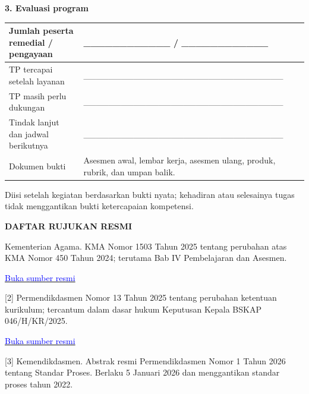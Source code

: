 \documentclass[11pt,a4paper]{article}
\begin{document}
\par\medskip\noindent\textbf{3. Evaluasi program}\par\smallskip
{\small\setlength{\tabcolsep}{2mm}\renewcommand{\arraystretch}{1.35}\begin{longtable}{|>{\raggedright\arraybackslash}p{77.826mm}|>{\raggedright\arraybackslash}p{91.724mm}|}\hline
Jumlah peserta remedial / pengayaan & \_\_\_\_\_\_\_\_\_\_\_\_ / \_\_\_\_\_\_\_\_\_\_\_\_\\ \hline
TP tercapai setelah layanan & \_\_\_\_\_\_\_\_\_\_\_\_\_\_\_\_\_\_\_\_\_\_\_\_\_\_\_\_\_\_\_\_\\ \hline
TP masih perlu dukungan & \_\_\_\_\_\_\_\_\_\_\_\_\_\_\_\_\_\_\_\_\_\_\_\_\_\_\_\_\_\_\_\_\\ \hline
Tindak lanjut dan jadwal berikutnya & \_\_\_\_\_\_\_\_\_\_\_\_\_\_\_\_\_\_\_\_\_\_\_\_\_\_\_\_\_\_\_\_\\ \hline
Dokumen bukti & Asesmen awal, lembar kerja, asesmen ulang, produk, rubrik, dan umpan balik.\\ \hline
\end{longtable}}\medskip
{\small Diisi setelah kegiatan berdasarkan bukti nyata; kehadiran atau selesainya tugas tidak menggantikan bukti ketercapaian kompetensi.\par}\medskip
\clearpage
\begin{center}\bfseries\large DAFTAR RUJUKAN RESMI\end{center}\medskip
[1] Kementerian Agama. KMA Nomor 1503 Tahun 2025 tentang perubahan atas KMA Nomor 450 Tahun 2024; terutama Bab IV Pembelajaran dan Asesmen.\par\medskip
\href{https://sulteng.kemenag.go.id/files/show/20251020162801surat-penyampaian-kma-kurikulum-2025%2Blampiran_compressed-tzR.pdf}{\small\textcolor{blue}{Buka sumber resmi}}\par
\vspace{8.50393701pt}
[2] Permendikdasmen Nomor 13 Tahun 2025 tentang perubahan ketentuan kurikulum; tercantum dalam dasar hukum Keputusan Kepala BSKAP 046/H/KR/2025.\par\medskip
\href{https://bpmpbabel.kemendikdasmen.go.id/PPID/wp-content/uploads/2025/07/KepKaBSKAP-046_2025-ttg-CP.pdf}{\small\textcolor{blue}{Buka sumber resmi}}\par
\vspace{8.50393701pt}
[3] Kemendikdasmen. Abstrak resmi Permendikdasmen Nomor 1 Tahun 2026 tentang Standar Proses. Berlaku 5 Januari 2026 dan menggantikan standar proses tahun 2022.\par\medskip
\end{document}
